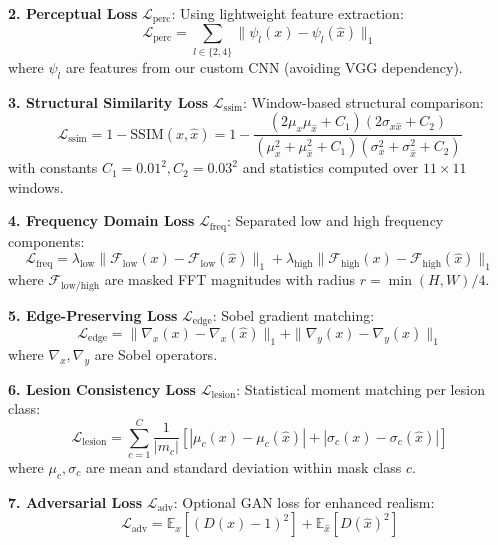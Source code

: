 \documentclass[10pt,twocolumn,letterpaper]{article}
\begin{document}
\textbf{2. Perceptual Loss} $\mathcal{L}_{\text{perc}}$: Using lightweight feature extraction:
\begin{equation}
\mathcal{L}_{\text{perc}} = \sum_{l \in \{2,4\}} \|\psi_l(x) - \psi_l(\hat{x})\|_1
\end{equation}
where $\psi_l$ are features from our custom CNN (avoiding VGG dependency).

\textbf{3. Structural Similarity Loss} $\mathcal{L}_{\text{ssim}}$: Window-based structural comparison:
\begin{equation}
\mathcal{L}_{\text{ssim}} = 1 - \text{SSIM}(x, \hat{x}) = 1 - \frac{(2\mu_x\mu_{\hat{x}} + C_1)(2\sigma_{x\hat{x}} + C_2)}{(\mu_x^2 + \mu_{\hat{x}}^2 + C_1)(\sigma_x^2 + \sigma_{\hat{x}}^2 + C_2)}
\end{equation}
with constants $C_1 = 0.01^2, C_2 = 0.03^2$ and statistics computed over $11 \times 11$ windows.

\textbf{4. Frequency Domain Loss} $\mathcal{L}_{\text{freq}}$: Separated low and high frequency components:
\begin{equation}
\mathcal{L}_{\text{freq}} = \lambda_{\text{low}} \|\mathcal{F}_{\text{low}}(x) - \mathcal{F}_{\text{low}}(\hat{x})\|_1 + \lambda_{\text{high}} \|\mathcal{F}_{\text{high}}(x) - \mathcal{F}_{\text{high}}(\hat{x})\|_1
\end{equation}
where $\mathcal{F}_{\text{low/high}}$ are masked FFT magnitudes with radius $r = \min(H,W)/4$.

\textbf{5. Edge-Preserving Loss} $\mathcal{L}_{\text{edge}}$: Sobel gradient matching:
\begin{equation}
\mathcal{L}_{\text{edge}} = \|\nabla_x(x) - \nabla_x(\hat{x})\|_1 + \|\nabla_y(x) - \nabla_y(\hat{x})\|_1
\end{equation}
where $\nabla_x, \nabla_y$ are Sobel operators.

\textbf{6. Lesion Consistency Loss} $\mathcal{L}_{\text{lesion}}$: Statistical moment matching per lesion class:
\begin{equation}
\mathcal{L}_{\text{lesion}} = \sum_{c=1}^C \frac{1}{|m_c|} \left[ |\mu_c(x) - \mu_c(\hat{x})| + |\sigma_c(x) - \sigma_c(\hat{x})| \right]
\end{equation}
where $\mu_c, \sigma_c$ are mean and standard deviation within mask class $c$.

\textbf{7. Adversarial Loss} $\mathcal{L}_{\text{adv}}$: Optional GAN loss for enhanced realism:
\begin{equation}
\mathcal{L}_{\text{adv}} = \mathbb{E}_x[(D(x) - 1)^2] + \mathbb{E}_{\hat{x}}[D(\hat{x})^2]
\end{equation}
\end{document}
